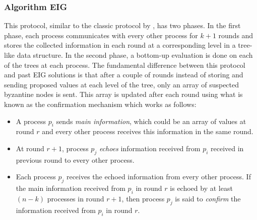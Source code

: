 \subsubsection{Algorithm EIG \cite{KM13}}
This protocol, similar to the classic protocol by \cite{Bar-NoyD91}, has two phases. In the first phase, each process communicates with every other process for $k + 1$ rounds and stores the collected information in each round at a corresponding level in a tree-like data structure. In the second phase, a bottom-up evaluation is done on each of the trees at each process. The fundamental difference between this protocol and past EIG solutions is that after a couple of rounds instead of storing and sending proposed values at each level of the tree, only an array of suspected byzantine nodes is sent. This array is updated after each round using what is known as the confirmation mechanism which works as follows:
\begin{itemize}
\item A process $p_i$ sends \textit{main information}, which could be an array of values at round $r$ and every other process receives this information in the same round.
\item At round $r+1$, process $p_j$ \textit{echoes} information received from $p_i$ received in previous round to every other process. 
\item Each process $p_j$ receives the echoed information from every other process. If the main information received from $p_i$ in round $r$ is echoed by at least $(n - k)$ processes in round $r+1$, then process $p_j$ is said to \textit{confirm} the information received from $p_i$ in round $r$.
    \end{itemize}

